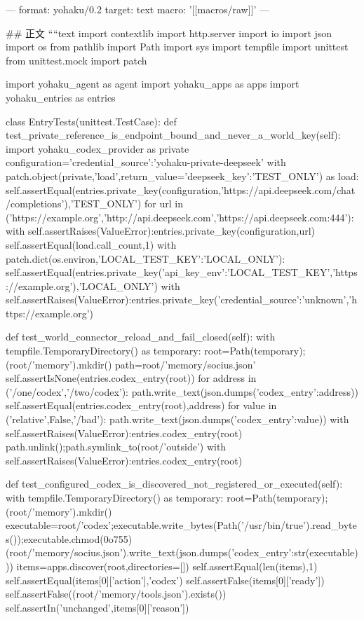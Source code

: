 ---
format: yohaku/0.2
target: text
macro: '[[macros/raw]]'
---

## 正文
````text
import contextlib
import http.server
import io
import json
import os
from pathlib import Path
import sys
import tempfile
import unittest
from unittest.mock import patch

import yohaku_agent as agent
import yohaku_apps as apps
import yohaku_entries as entries


class EntryTests(unittest.TestCase):
    def test_private_reference_is_endpoint_bound_and_never_a_world_key(self):
        import yohaku_codex_provider as private
        configuration={'credential_source':'yohaku-private-deepseek'}
        with patch.object(private,'load',return_value={'deepseek_key':'TEST_ONLY'}) as load:
            self.assertEqual(entries.private_key(configuration,'https://api.deepseek.com/chat/completions'),'TEST_ONLY')
            for url in ('https://example.org','http://api.deepseek.com','https://api.deepseek.com:444'):
                with self.assertRaises(ValueError):entries.private_key(configuration,url)
            self.assertEqual(load.call_count,1)
        with patch.dict(os.environ,{'LOCAL_TEST_KEY':'LOCAL_ONLY'}):
            self.assertEqual(entries.private_key({'api_key_env':'LOCAL_TEST_KEY'},'https://example.org'),'LOCAL_ONLY')
        with self.assertRaises(ValueError):entries.private_key({'credential_source':'unknown'},'https://example.org')

    def test_world_connector_reload_and_fail_closed(self):
        with tempfile.TemporaryDirectory() as temporary:
            root=Path(temporary);(root/'memory').mkdir()
            path=root/'memory/socius.json'
            self.assertIsNone(entries.codex_entry(root))
            for address in ('/one/codex','/two/codex'):
                path.write_text(json.dumps({'codex_entry':address}))
                self.assertEqual(entries.codex_entry(root),address)
            for value in ('relative',False,'/bad\nentry'):
                path.write_text(json.dumps({'codex_entry':value}))
                with self.assertRaises(ValueError):entries.codex_entry(root)
            path.unlink();path.symlink_to(root/'outside')
            with self.assertRaises(ValueError):entries.codex_entry(root)

    def test_configured_codex_is_discovered_not_registered_or_executed(self):
        with tempfile.TemporaryDirectory() as temporary:
            root=Path(temporary);(root/'memory').mkdir()
            executable=root/'codex';executable.write_bytes(Path('/usr/bin/true').read_bytes());executable.chmod(0o755)
            (root/'memory/socius.json').write_text(json.dumps({'codex_entry':str(executable)}))
            items=apps.discover(root,directories=[])
            self.assertEqual(len(items),1)
            self.assertEqual(items[0]['action'],'codex')
            self.assertFalse(items[0]['ready'])
            self.assertFalse((root/'memory/tools.json').exists())
            self.assertIn('unchanged',items[0]['reason'])

